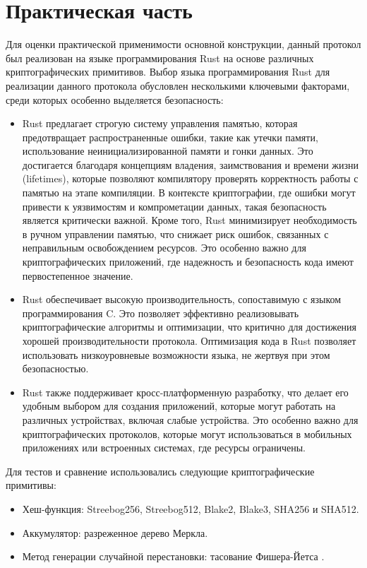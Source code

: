 \chapter{Практическая часть}
Для оценки практической применимости основной конструкции, данный протокол был реализован на языке программирования Rust на основе различных криптографических примитивов.
Выбор языка программирования Rust для реализации данного протокола обусловлен несколькими ключевыми факторами, среди которых особенно выделяется безопасность:
\begin{itemize}
	\item Rust предлагает строгую систему управления памятью, которая предотвращает распространенные ошибки, такие как утечки памяти, использование неинициализированной памяти и гонки данных. Это достигается благодаря концепциям владения, заимствования и времени жизни (lifetimes), которые позволяют компилятору проверять корректность работы с памятью на этапе компиляции. В контексте криптографии, где ошибки могут привести к уязвимостям и компрометации данных, такая безопасность является критически важной. Кроме того, Rust минимизирует необходимость в ручном управлении памятью, что снижает риск ошибок, связанных с неправильным освобождением ресурсов. Это особенно важно для криптографических приложений, где надежность и безопасность кода имеют первостепенное значение.
	\item Rust обеспечивает высокую производительность, сопоставимую с языком программирования C. Это позволяет эффективно реализовывать криптографические алгоритмы и оптимизации, что критично для достижения хорошей производительности протокола. Оптимизация кода в Rust позволяет использовать низкоуровневые возможности языка, не жертвуя при этом безопасностью.
	\item Rust также поддерживает кросс-платформенную разработку, что делает его удобным выбором для создания приложений, которые могут работать на различных устройствах, включая слабые устройства. Это особенно важно для криптографических протоколов, которые могут использоваться в мобильных приложениях или встроенных системах, где ресурсы ограничены.
\end{itemize}

Для тестов и сравнение использовались следующие криптографические примитивы:
\begin{itemize}
	\item Хеш-функция: Streebog256, Streebog512, Blake2, Blake3, SHA256 и SHA512.
	\item Аккумулятор: разреженное дерево Меркла.
	\item Метод генерации случайной перестановки: тасование Фишера-Йетса \cite{10.1145/364520.364540}.
\end{itemize}

